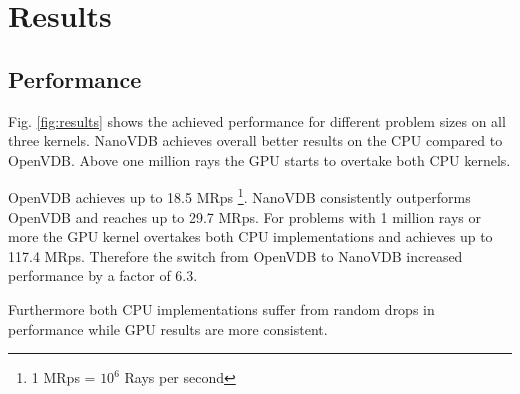 \section{Results}
\subsection{Performance}

Fig. \ref{fig:results} shows the achieved performance for different problem sizes on all three kernels.
NanoVDB achieves overall better results on the CPU compared to OpenVDB.
Above one million rays the GPU starts to overtake both CPU kernels.

OpenVDB achieves up to 18.5 MRps \footnote{1 MRps = $10^6$ Rays per second}. NanoVDB consistently outperforms OpenVDB and reaches up to 29.7 MRps.
For problems with 1 million rays or more the GPU kernel overtakes both CPU implementations and achieves up to 117.4 MRps.
Therefore the switch from OpenVDB to NanoVDB increased performance by a factor of 6.3.

Furthermore both CPU implementations suffer from random drops in performance while GPU results are more consistent.


